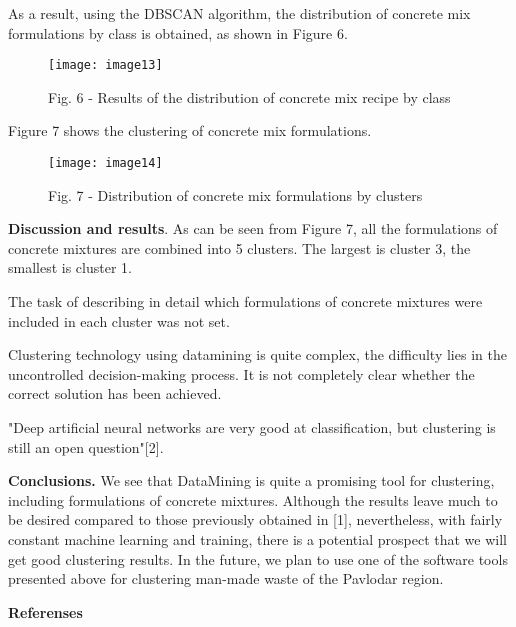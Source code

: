 As a result, using the DBSCAN algorithm, the distribution of concrete
mix formulations by class is obtained, as shown in Figure 6.

\begin{figure}
  \centering
  \texttt{[image: image13]}
  \caption*{Fig. 6 - Results of the distribution of concrete mix recipe by class}
\end{figure}

Figure 7 shows the clustering of concrete mix formulations.

\begin{figure}
  \centering
  \texttt{[image: image14]}
  \caption*{Fig. 7 - Distribution of concrete mix formulations by clusters}
\end{figure}

{\bfseries Discussion and results}. As can be seen from Figure 7, all the
formulations of concrete mixtures are combined into 5 clusters. The
largest is cluster 3, the smallest is cluster 1.

The task of describing in detail which formulations of concrete mixtures
were included in each cluster was not set.

Clustering technology using datamining is quite complex, the difficulty
lies in the uncontrolled decision-making process. It is not completely
clear whether the correct solution has been achieved.

"Deep artificial neural networks are very good at classification, but
clustering is still an open question"{[}2{]}.

{\bfseries Conclusions.} We see that DataMining is quite a promising tool
for clustering, including formulations of concrete mixtures. Although
the results leave much to be desired compared to those previously
obtained in {[}1{]}, nevertheless, with fairly constant machine learning
and training, there is a potential prospect that we will get good
clustering results. In the future, we plan to use one of the software
tools presented above for clustering man-made waste of the Pavlodar
region.

{\bfseries Referenses}


